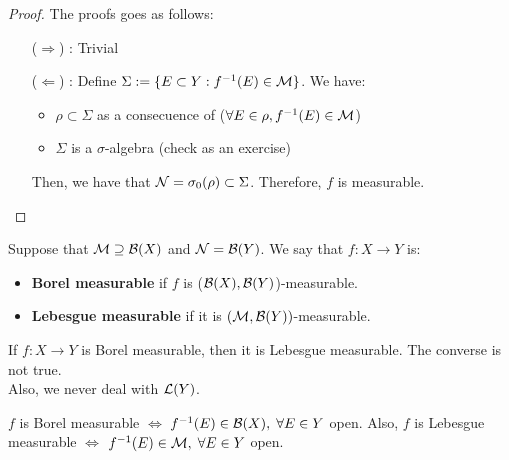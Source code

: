 \begin{proof}
    The proofs goes as follows:

    \begin{itemize}
        \item[($\Rightarrow$)]: Trivial
        \item[($\Leftarrow$)]:
        Define $\Sigma := \{E \subset Y: f^{-1}(E) \in \mathcal{M}\}$. We have:

        \begin{itemize}[label=$\bullet$]
            \item $\rho \subset \Sigma$ as a consecuence of ($\forall E \in \rho, f^{-1}(E) \in \mathcal{M}$)
            \item $\Sigma$ is a $\sigma$-algebra (check as an exercise)
        \end{itemize}

        Then, we have that $\mathcal{N} = \sigma_0(\rho) \subset \Sigma$. Therefore, $f$ is measurable. 

    \end{itemize}
\end{proof}

\begin{fdefinition}
    Suppose that $\mathcal{M} \supseteq \mathcal{B}(X)$ and $\mathcal{N} = \mathcal{B}(Y)$.
    We say that $f: X \to Y$ is:
    \vspace{1em}

    \begin{itemize}
        \item \textbf{Borel measurable} if $f$ is ($\mathcal{B}(X),\mathcal{B}(Y)$)-measurable.
        \vspace{1em}
        \item \textbf{Lebesgue measurable} if it is $(\mathcal{M}, \mathcal{B}(Y))$-measurable.
    \end{itemize}
\end{fdefinition}

\begin{fremark}
    If $f: X \to Y$ is Borel measurable, then it is Lebesgue measurable. 
    The converse is not true.\\

    Also, we never deal with $\mathcal{L}(Y)$.
\end{fremark}

\vspace{1em}

\begin{fcorollary}
    $f$ is Borel measurable $\iff$ $f^{-1}(E) \in \mathcal{B}(X), \; \forall E \in Y$ open.
    Also, $f$ is Lebesgue measurable $\iff$ $f^{-1}(E) \in \mathcal{M}, \; \forall E \in Y$ open.
\end{fcorollary}

